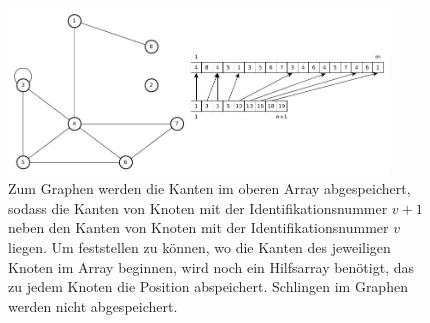 \documentclass[11pt,a4paper]{article}
\begin{document}
\begin{figure}[h]
 	\centering
	\includegraphics[width=0.9\textwidth]{graphrepresentation}
 	\caption{Zum Graphen werden die Kanten im oberen Array abgespeichert, sodass die Kanten von Knoten mit der Identifikationsnummer \(v+1\) neben den Kanten von Knoten mit der Identifikationsnummer \(v\) liegen. Um feststellen zu können, wo die Kanten des jeweiligen Knoten im Array beginnen, wird noch ein Hilfsarray benötigt, das zu jedem Knoten die Position abspeichert. Schlingen im Graphen werden nicht abgespeichert.}
	\label{fig:graphrepresentation}
\end{figure}
\end{document}
